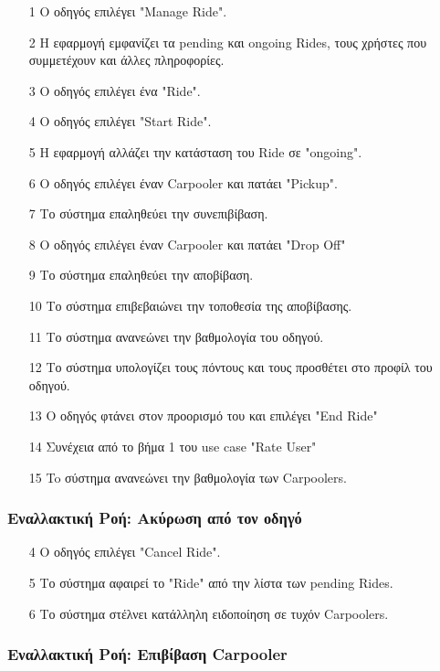 \begin{enumerate}
    \item[1] Ο οδηγός επιλέγει "Manage Ride".
    \item[2] Η εφαρμογή εμφανίζει τα pending και ongoing Rides, τους χρήστες που συμμετέχουν και άλλες
        πληροφορίες.
    \item[3] Ο οδηγός επιλέγει ένα "Ride".
    \item[4] Ο οδηγός επιλέγει "Start Ride".
    \item[5] Η εφαρμογή αλλάζει την κατάσταση του Ride σε "ongoing".
    \item[6] Ο οδηγός επιλέγει έναν Carpooler και πατάει "Pickup".
    \item[7] Το σύστημα επαληθεύει την συνεπιβίβαση.
    \item[8] Ο οδηγός επιλέγει έναν Carpooler και πατάει "Drop Off"
    \item[9] Το σύστημα επαληθεύει την αποβίβαση.
    \item[10] Το σύστημα επιβεβαιώνει την τοποθεσία της αποβίβασης.
    \item[11] Το σύστημα ανανεώνει την βαθμολογία του οδηγού.
    \item[12] Το σύστημα υπολογίζει τους πόντους και τους προσθέτει στο προφίλ του οδηγού.
    \item[13] Ο οδηγός φτάνει στον προορισμό του και επιλέγει "End Ride"
    \item[14] Συνέχεια από το βήμα 1 του use case "Rate User"
    \item[15] To σύστημα ανανεώνει την βαθμολογία των Carpoolers.
\end{enumerate}

\subsubsection{Εναλλακτική Ροή: Ακύρωση από τον οδηγό}

\begin{enumerate}
    \item[4] O οδηγός επιλέγει "Cancel Ride".
    \item[5] Το σύστημα αφαιρεί το "Ride" από την λίστα των pending Rides.
    \item[6] Το σύστημα στέλνει κατάλληλη ειδοποίηση σε τυχόν Carpoolers.
\end{enumerate}

\subsubsection{Εναλλακτική Ροή: Επιβίβαση Carpooler}

